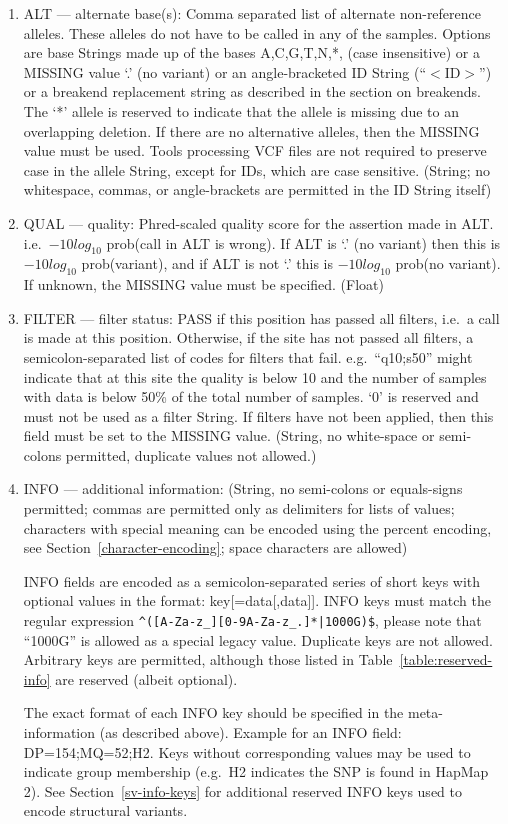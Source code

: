 \documentclass[8pt]{article}
\begin{document}
\begin{enumerate}
  \item ALT --- alternate base(s): Comma separated list of alternate non-reference alleles.
  These alleles do not have to be called in any of the samples.
  Options are base Strings made up of the bases A,C,G,T,N,*, (case insensitive) or a MISSING value `.' (no variant) or an angle-bracketed ID String (``$<$ID$>$'') or a breakend replacement string as described in the section on breakends.
  The `*' allele is reserved to indicate that the allele is missing due to an overlapping deletion.
  If there are no alternative alleles, then the MISSING value must be used.
  Tools processing VCF files are not required to preserve case in the allele String, except for IDs, which are case sensitive.
  (String; no whitespace, commas, or angle-brackets are permitted in the ID String itself)
  \item QUAL --- quality: Phred-scaled quality score for the assertion made in ALT. i.e.\ $-10log_{10}$ prob(call in ALT is wrong).
  If ALT is `.' (no variant) then this is $-10log_{10}$ prob(variant), and if ALT is not `.' this is $-10log_{10}$ prob(no variant).
  If unknown, the MISSING value must be specified. (Float)
  \item FILTER --- filter status: PASS if this position has passed all filters, i.e.\ a call is made at this position.
  Otherwise, if the site has not passed all filters, a semicolon-separated list of codes for filters that fail. e.g.\ ``q10;s50'' might indicate that at this site the quality is below 10 and the number of samples with data is below 50\% of the total number of samples.
  `0' is reserved and must not be used as a filter String.
  If filters have not been applied, then this field must be set to the MISSING value.
  (String, no white-space or semi-colons permitted, duplicate values not allowed.)
  \item INFO --- additional information: (String, no semi-colons or equals-signs permitted; commas are permitted only as delimiters for lists of values; characters with special meaning can be encoded using the percent encoding, see Section~\ref{character-encoding}; space characters are allowed)

  INFO fields are encoded as a semicolon-separated series of short keys with optional values in the format: key[=data[,data]].
  INFO keys must match the regular expression \texttt{\^{}([A-Za-z\_][0-9A-Za-z\_.]*|1000G)\$}, please note that ``1000G'' is allowed as a special legacy value.
  Duplicate keys are not allowed.
  Arbitrary keys are permitted, although those listed in Table~\ref{table:reserved-info} are reserved (albeit optional).

  The exact format of each INFO key should be specified in the meta-information (as described above).
  Example for an INFO field: DP=154;MQ=52;H2.
  Keys without corresponding values may be used to indicate group membership (e.g.\ H2 indicates the SNP is found in HapMap 2).
  See Section~\ref{sv-info-keys} for additional reserved INFO keys used to encode structural variants.
\end{enumerate}
\end{document}
